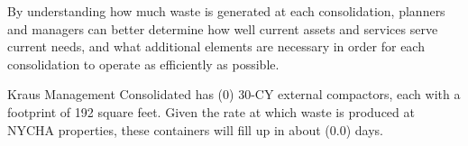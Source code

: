 
    By understanding how much waste is generated at each consolidation, planners and managers
    can better determine how well current assets and services serve current needs, and what additional 
    elements are necessary in order for each consolidation to operate as efficiently as possible. 

    Kraus Management Consolidated has (0) 30-CY external compactors, each with a footprint of 192 square feet. Given the rate at which waste is produced at NYCHA properties, these containers will fill
    up in about (0.0) days.